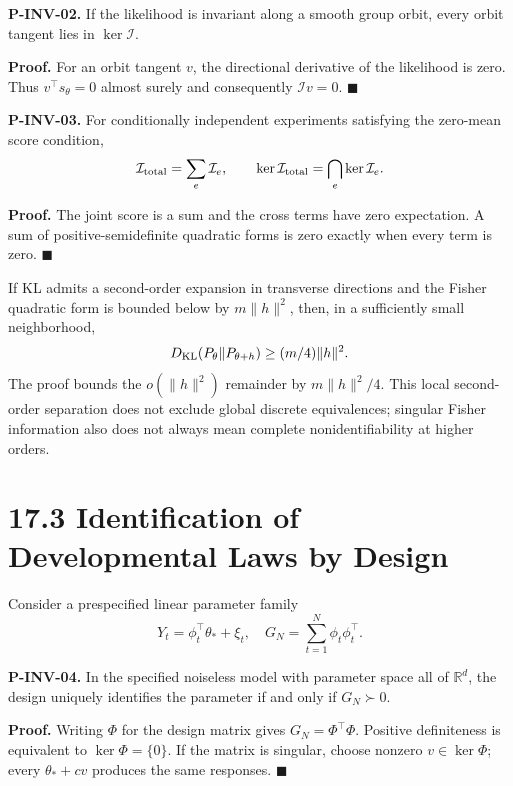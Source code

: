 \documentclass[
  english,
  11pt,
  oneside]{book}
\begin{document}
\hypertarget{p-inv-02}{}\label{p-inv-02}

\textbf{P-INV-02.} If the likelihood is invariant along a smooth group orbit, every orbit tangent lies in \(\ker\mathcal I\).

\textbf{Proof.} For an orbit tangent \(v\), the directional derivative of the likelihood is zero. Thus \(v^\top s_\theta=0\) almost surely and consequently \(\mathcal I v=0\). \(\blacksquare\)

\hypertarget{p-inv-03}{}\label{p-inv-03}

\textbf{P-INV-03.} For conditionally independent experiments satisfying the zero-mean score condition, \[\mathcal I_{\rm total}=\sum_e\mathcal I_e,\qquad
\ker\mathcal I_{\rm total}=\bigcap_e\ker\mathcal I_e.\]

\textbf{Proof.} The joint score is a sum and the cross terms have zero expectation. A sum of positive-semidefinite quadratic forms is zero exactly when every term is zero. \(\blacksquare\)

If KL admits a second-order expansion in transverse directions and the Fisher quadratic form is bounded below by \(m\|h\|^2\), then, in a sufficiently small neighborhood, \[D_{\rm KL}(P_\theta\|P_{\theta+h})\ge(m/4)\|h\|^2.\] The proof bounds the \(o(\|h\|^2)\) remainder by \(m\|h\|^2/4\). This local second-order separation does not exclude global discrete equivalences; singular Fisher information also does not always mean complete nonidentifiability at higher orders.

\section{17.3 Identification of Developmental Laws by Design}\label{identification-of-developmental-laws-by-design}

Consider a prespecified linear parameter family \[Y_t=\phi_t^\top\theta_*+\xi_t,\quad
G_N=\sum_{t=1}^N\phi_t\phi_t^\top.\]

\hypertarget{p-inv-04}{}\label{p-inv-04}

\textbf{P-INV-04.} In the specified noiseless model with parameter space all of \(\mathbb R^d\), the design uniquely identifies the parameter if and only if \(G_N\succ0\).

\textbf{Proof.} Writing \(\Phi\) for the design matrix gives \(G_N=\Phi^\top\Phi\). Positive definiteness is equivalent to \(\ker\Phi=\{0\}\). If the matrix is singular, choose nonzero \(v\in\ker\Phi\); every \(\theta_*+cv\) produces the same responses. \(\blacksquare\)
\end{document}
